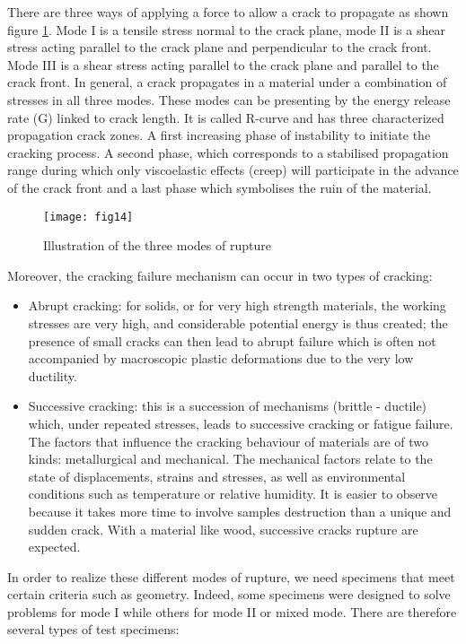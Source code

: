 There are three ways of applying a force to allow a crack to propagate as shown figure \ref{fig:fig14}. Mode I is a tensile stress normal to the crack plane, mode II is a shear stress acting parallel to the crack plane and perpendicular to the crack front. Mode III is a shear stress acting parallel to the crack plane and parallel to the crack front. In general, a crack propagates in a material under a combination of stresses in all three modes. These modes can be presenting by the energy release rate (G) linked to crack length. It is called R-curve and has three characterized propagation crack zones. A first increasing phase of instability to initiate the cracking process. A second phase, which corresponds to a stabilised propagation range during which only viscoelastic effects (creep) will participate in the advance of the crack front and a last phase which symbolises the ruin of the material.


\begin{figure}[htp]
	\centering
	\texttt{[image: fig14]}
	\caption{Illustration of the three modes of rupture}
	\label{fig:fig14}
\end{figure}

Moreover, the cracking failure mechanism can occur in two types of cracking: 

\begin{itemize}
	\item Abrupt cracking: for solids, or for very high strength materials, the working stresses are very high, and considerable potential energy is thus created; the presence of small cracks can then lead to abrupt failure which is often not accompanied by macroscopic plastic deformations due to the very low ductility. 
	\item Successive cracking: this is a succession of mechanisms (brittle - ductile) which, under repeated stresses, leads to successive cracking or fatigue failure. The factors that influence the cracking behaviour of materials are of two kinds: metallurgical and mechanical. The mechanical factors relate to the state of displacements, strains and stresses, as well as environmental conditions such as temperature or relative humidity. It is easier to observe because it takes more time to involve samples destruction than a unique and sudden crack. With a material like wood, successive cracks rupture are expected.
\end{itemize}

In order to realize these different modes of rupture, we need specimens that meet certain criteria such as geometry. Indeed, some specimens were designed to solve problems for mode I while others for mode II or mixed mode. There are therefore several types of test specimens:


